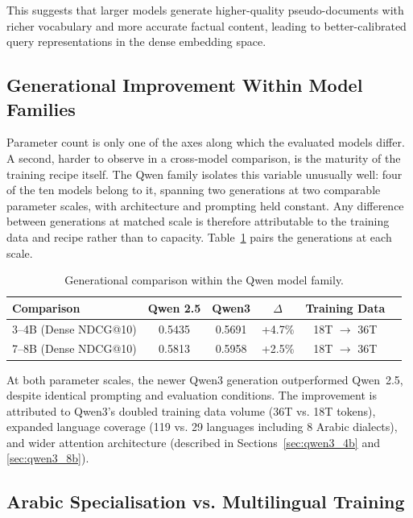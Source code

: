 This suggests that larger models generate higher-quality pseudo-documents with richer vocabulary and more accurate factual content, leading to better-calibrated query representations in the dense embedding space.

\subsection{Generational Improvement Within Model Families}
\label{sec:res_finding_generation}

Parameter count is only one of the axes along which the evaluated models differ. A second, harder to observe in a cross-model comparison, is the maturity of the training recipe itself. The Qwen family isolates this variable unusually well: four of the ten models belong to it, spanning two generations at two comparable parameter scales, with architecture and prompting held constant. Any difference between generations at matched scale is therefore attributable to the training data and recipe rather than to capacity. Table~\ref{tab:qwen_generations} pairs the generations at each scale.

\begin{table}[htbp]
    \centering
    \caption[Generational comparison within the Qwen family]{Generational comparison within the Qwen model family.}
    \label{tab:qwen_generations}
    \begin{tabular}{@{}lccccc@{}}
        \toprule
        \textbf{Comparison} & \textbf{Qwen 2.5} & \textbf{Qwen3} & \textbf{$\Delta$} & \textbf{Training Data} \\
        \midrule
        3--4B (Dense NDCG@10) & 0.5435 & 0.5691 & +4.7\% & 18T $\rightarrow$ 36T \\
        7--8B (Dense NDCG@10) & 0.5813 & 0.5958 & +2.5\% & 18T $\rightarrow$ 36T \\
        \bottomrule
    \end{tabular}
\end{table}

At both parameter scales, the newer Qwen3 generation outperformed Qwen~2.5, despite identical prompting and evaluation conditions. The improvement is attributed to Qwen3's doubled training data volume (36T vs. 18T tokens), expanded language coverage (119 vs. 29 languages including 8 Arabic dialects), and wider attention architecture (described in Sections~\ref{sec:qwen3_4b} and \ref{sec:qwen3_8b}).

\subsection{Arabic Specialisation vs. Multilingual Training}
\label{sec:res_finding_arabic}

